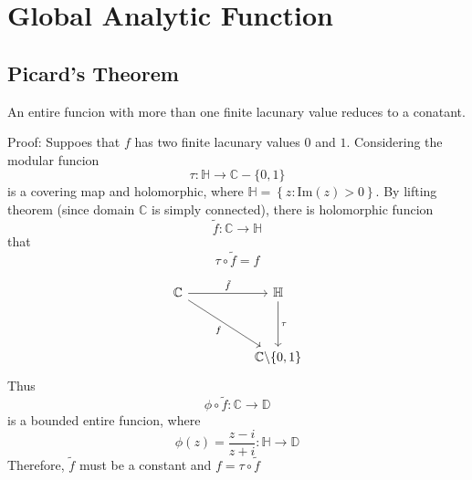 \documentclass[12pt, oneside]{book}
\begin{document}
\chapter{Global Analytic Function}

\section{Picard's Theorem}
\begin{theorem}
    An entire funcion with more than one finite lacunary value reduces to a conatant.

    Proof:
    Suppoes that $f$ has two finite lacunary values $0$ and $1$. Considering the modular funcion
    \begin{equation*}
        \tau : \mathbb{H}\rightarrow \mathbb{C}-\{0,1\}
    \end{equation*}
    is a covering map and holomorphic, where $\mathbb{H}=\left\{z: \mathrm{Im}(z)>0\right\}$.
    By lifting theorem (since domain $\mathbb{C}$ is simply connected), there is holomorphic funcion
    \[
        \tilde{f}
        :
        \mathbb{C} \rightarrow \mathbb{H}
    \]
    that
    \[
        \tau \circ \tilde{f}
        =f
    \]

    \begin{equation*}
        \begin{tikzcd}
            \mathbb{C} \arrow[rrdd, "f"'] \arrow[rr, "\tilde{f}"] &  & \mathbb{H} \arrow[dd, "\tau"] \\
            &  &                               \\
            &  & {\mathbb {C} \backslash \{0,1\}}
        \end{tikzcd}
    \end{equation*}
    Thus
    \[
        \phi\circ \tilde{f}:
        \mathbb{C}\rightarrow \mathbb{D}
    \]
    is a bounded entire funcion, where
    \begin{equation*}
        \phi(z) =\frac{z-i}{z+i}
        :
        \mathbb{H}\rightarrow
        \mathbb{D}
    \end{equation*}
    Therefore, $\tilde{f}$ must be a constant and $f=\tau \circ \tilde{f}$
\end{theorem}
\end{document}
